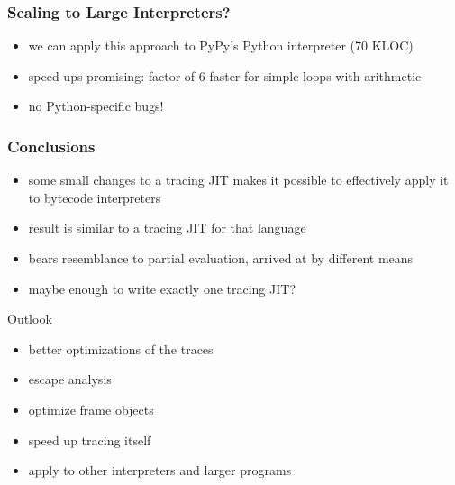 \documentclass[utf8x]{beamer}
\begin{document}
\begin{frame}
    \frametitle{Scaling to Large Interpreters?}
    \begin{itemize}
    \item we can apply this approach to PyPy's Python interpreter (70 KLOC)
    \item speed-ups promising: factor of 6 faster for simple loops with arithmetic
    \item no Python-specific bugs!
    \end{itemize}
\end{frame}


\begin{frame}
    \frametitle{Conclusions}
    \begin{itemize}
    \item some small changes to a tracing JIT makes it possible to effectively apply it to bytecode interpreters
    \item result is similar to a tracing JIT for that language
    \item bears resemblance to partial evaluation, arrived at by different means
    \item maybe enough to write exactly one tracing JIT?
    \end{itemize}
    \pause
    \begin{block}{Outlook}
        \begin{itemize}
        \item better optimizations of the traces
        \item escape analysis
        \item optimize frame objects
        \item speed up tracing itself
        \item apply to other interpreters and larger programs
        \end{itemize}
    \end{block}
\end{frame}
\end{document}

